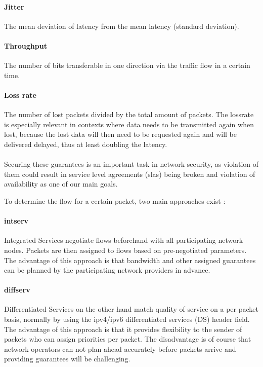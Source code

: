 \paragraph{Jitter} The mean deviation of \gls{latency} from the mean \gls{latency} (standard deviation).

\paragraph{Throughput} The number of bits transferable in one direction via the traffic flow in a certain time.

\paragraph{Loss rate} The number of lost packets divided by the total amount of packets. The \gls{lossrate} is especially relevant in contexts where data needs to be transmitted again when lost, because the lost data will then need to be requested again and will be delivered delayed, thus at least doubling the \gls{latency}.

\paragraph{}Securing these guarantees is an important task in network security, as violation of them could result in service level agreements (\acrshort{sla}s) being broken and violation of availability as one of our main goals.

To determine the flow for a certain packet, two main approaches exist \cite{serv}:

\paragraph{\acrshort{intserv}} Integrated Services \cite{rfc1633} negotiate flows beforehand with all participating network nodes. Packets are then assigned to flows based on pre-negotiated parameters. The advantage of this approach is that \gls{bandwidth} and other assigned guarantees can be planned by the participating network providers in advance.

\paragraph{\acrshort{diffserv}} Differentiated Services \cite{rfc2474} on the other hand match quality of service on a per packet basis, normally by using the \acrshort{ipv4}/\acrshort{ipv6} differentiated services (DS) header field. The advantage of this approach is that it provides flexibility to the sender of packets who can assign priorities per packet. The disadvantage is of course that network operators can not plan ahead accurately before packets arrive and providing guarantees will be challenging.

